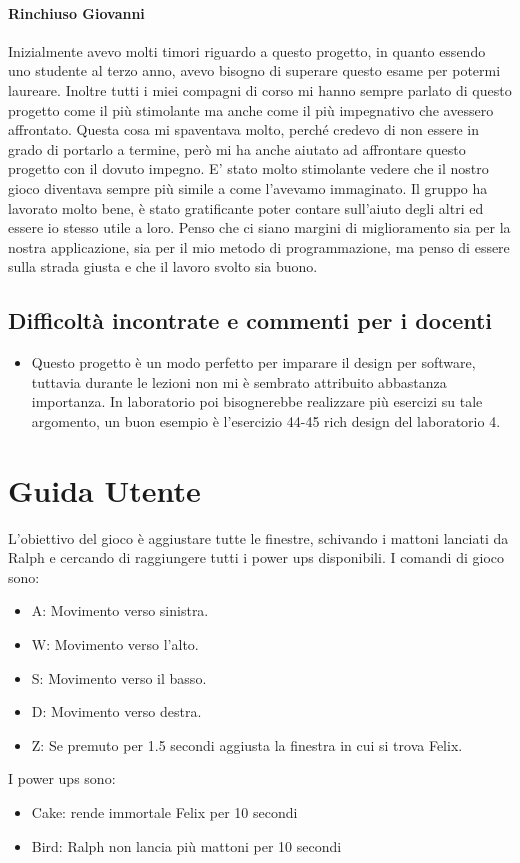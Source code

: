 \documentclass[a4paper,12pt]{report}
\begin{document}
\subsubsection{Rinchiuso Giovanni}
Inizialmente avevo molti timori riguardo a questo progetto, in quanto essendo uno studente al terzo anno, avevo bisogno di superare questo esame per potermi laureare. Inoltre tutti i miei compagni di corso mi hanno sempre parlato di questo progetto come il più stimolante ma anche come il più impegnativo che avessero affrontato. Questa cosa mi spaventava molto, perché credevo di non essere in grado di portarlo a termine, però mi ha anche aiutato ad affrontare questo progetto con il dovuto impegno. E' stato molto stimolante vedere che il nostro gioco diventava sempre più simile a come l'avevamo immaginato. Il gruppo ha lavorato molto bene, è stato gratificante poter contare sull'aiuto degli altri ed essere io stesso utile a loro. Penso che ci siano margini di miglioramento sia per la nostra applicazione, sia per il mio metodo di programmazione, ma penso di essere sulla strada giusta e che il lavoro svolto sia buono. 

\section{Difficoltà incontrate e commenti per i docenti}
\begin{itemize}
    \item Questo progetto è un modo perfetto per imparare il design per software, tuttavia durante le lezioni non mi è sembrato attribuito abbastanza importanza. In laboratorio poi bisognerebbe realizzare più esercizi su tale argomento, un buon esempio è l'esercizio 44-45 rich design del laboratorio 4.
\end{itemize}
\appendix
\chapter{Guida Utente}
L'obiettivo del gioco è aggiustare tutte le finestre, schivando i mattoni lanciati da Ralph e cercando di raggiungere tutti i power ups disponibili.
I comandi di gioco sono:
\begin{itemize}
 \item A: Movimento verso sinistra.
 \item W: Movimento verso l'alto.
 \item S: Movimento verso il basso.
 \item D: Movimento verso destra.
 \item Z: Se premuto per 1.5 secondi aggiusta la finestra in cui si trova Felix.
\end{itemize}
I power ups sono:
\begin{itemize}
 \item Cake: rende immortale Felix per 10 secondi
 \item Bird: Ralph non lancia più mattoni per 10 secondi
\end{itemize}
\end{document}

